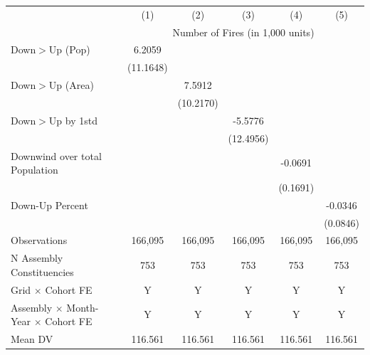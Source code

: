 \begin{tabular}{lccccc}
\hline
& (1) & (2) & (3) & (4) & (5)\\
& \multicolumn{5}{c}{Number of Fires (in 1,000 units) }\\
\hline

Down$>$Up (Pop)&      6.2059         &                     &                     &                     &                     \\
            &   (11.1648)         &                     &                     &                     &                     \\
Down$>$Up (Area)&                     &      7.5912         &                     &                     &                     \\
            &                     &   (10.2170)         &                     &                     &                     \\
Down$>$Up by 1std&                     &                     &     -5.5776         &                     &                     \\
            &                     &                     &   (12.4956)         &                     &                     \\
Downwind over total Population&                     &                     &                     &     -0.0691         &                     \\
            &                     &                     &                     &    (0.1691)         &                     \\
Down-Up Percent&                     &                     &                     &                     &     -0.0346         \\
            &                     &                     &                     &                     &    (0.0846)         \\
\hline
Observations&     166,095         &     166,095         &     166,095         &     166,095         &     166,095         \\
N Assembly Constituencies&         753         &         753         &         753         &         753         &         753         \\
Grid $\times$ Cohort FE&           Y         &           Y         &           Y         &           Y         &           Y         \\
Assembly $\times$ Month-Year $\times$ Cohort FE&           Y         &           Y         &           Y         &           Y         &           Y         \\
Mean DV     &     116.561         &     116.561         &     116.561         &     116.561         &     116.561         \\
\hline
\end{tabular}
